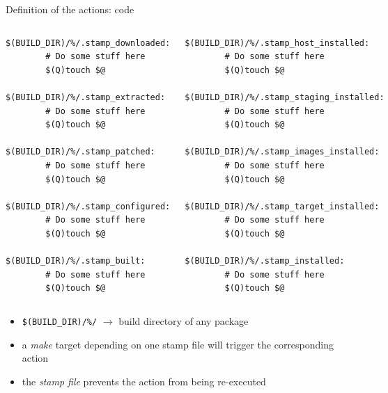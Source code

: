 \begin{frame}[fragile]{Definition of the actions: code}
  \begin{columns}
    \begin{block}{}
    \begin{verbatim}
$(BUILD_DIR)/%/.stamp_downloaded:
        # Do some stuff here
        $(Q)touch $@

$(BUILD_DIR)/%/.stamp_extracted:
        # Do some stuff here
        $(Q)touch $@

$(BUILD_DIR)/%/.stamp_patched:
        # Do some stuff here
        $(Q)touch $@

$(BUILD_DIR)/%/.stamp_configured:
        # Do some stuff here
        $(Q)touch $@

$(BUILD_DIR)/%/.stamp_built:
        # Do some stuff here
        $(Q)touch $@
      \end{verbatim}
      \end{block}
      \begin{block}{}
      \begin{verbatim}
$(BUILD_DIR)/%/.stamp_host_installed:
        # Do some stuff here
        $(Q)touch $@

$(BUILD_DIR)/%/.stamp_staging_installed:
        # Do some stuff here
        $(Q)touch $@

$(BUILD_DIR)/%/.stamp_images_installed:
        # Do some stuff here
        $(Q)touch $@

$(BUILD_DIR)/%/.stamp_target_installed:
        # Do some stuff here
        $(Q)touch $@

$(BUILD_DIR)/%/.stamp_installed:
        # Do some stuff here
        $(Q)touch $@
    \end{verbatim}
  \end{block}
 \end{columns}

 \begin{itemize}
 \item {\tt \$(BUILD\_DIR)/\%/} $\rightarrow$ build directory of any package
 \item a {\em make} target depending on one stamp file will trigger
   the corresponding action
 \item the {\em stamp file} prevents the action from being re-executed
 \end{itemize}

\end{frame}

